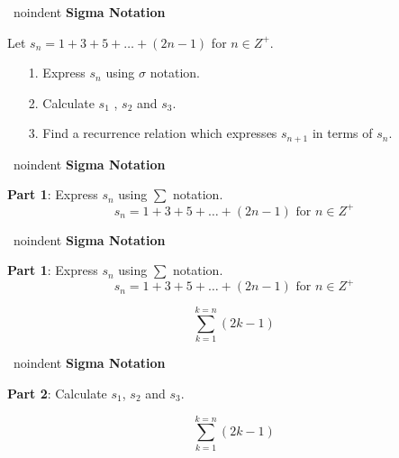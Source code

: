 

	\ noindent \textbf{Sigma Notation}
	
	\vspace{-1cm}
	Let $s_n = 1 + 3 + 5 + \ldots + (2n-1)$ for $n \in Z^{+}$.\\
	\bigskip
	\begin{itemize}
		\item[1.] Express $s_n$ using $\sigma$ notation. \\
		\bigskip
		\item[2.] Calculate $s_1$ , $s_2$ and $s_3$. \\
		\bigskip
		\item[3.] Find a recurrence relation which expresses $s_{n+1}$ in terms of $s_n$.
	\end{itemize}


	\ noindent \textbf{Sigma Notation}
	
	
	\textbf{Part 1}: Express $s_n$ using $\sum$ notation.
	\[s_n = 1 + 3 + 5 + \ldots + (2n-1) \mbox{   for }n \in Z^{+}\]
	
	
	


	\ noindent \textbf{Sigma Notation}
	
	\vspace{-1cm}
	\textbf{Part 1}: Express $s_n$ using $\sum$ notation.
	\[s_n = 1 + 3 + 5 + \ldots + (2n-1) \mbox{   for }n \in Z^{+}\]
	
	{
		
		\[  \sum^{k=n}_{k=1} (2k-1) \]
	}


	\ noindent \textbf{Sigma Notation}
	
	
	\textbf{Part 2}: Calculate $s_1$, $s_2$ and $s_3$.
	
	{
		
		\[  \sum^{k=n}_{k=1} (2k-1) \]
	}
	
	
	


